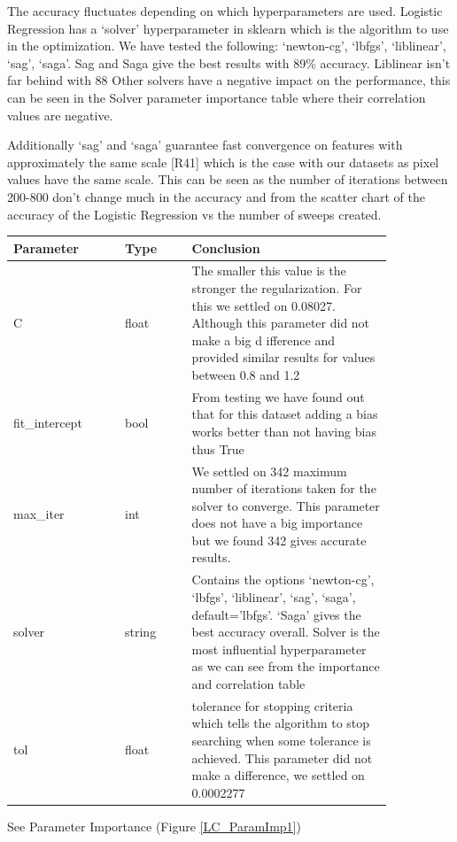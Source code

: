 \documentclass[11pt]{article}
\begin{document}
The accuracy fluctuates depending on which hyperparameters are used. Logistic Regression has a ‘solver’ hyperparameter in sklearn which is the algorithm to use in the optimization. We have tested the following: ‘newton-cg’, ‘lbfgs’, ‘liblinear’, ‘sag’, ‘saga’. Sag and Saga give the best results with 89\% accuracy. Liblinear isn't far behind with 88%
Other solvers have a negative impact on the performance, this can be seen in the Solver parameter importance table where their correlation values are negative.

Additionally ‘sag’ and ‘saga’ guarantee fast convergence on features with approximately the same scale [R41] which is the case with our datasets as pixel values have the same scale. This can be seen as the number of iterations between 200-800 don’t change much in the accuracy and from the scatter chart of the accuracy of the Logistic Regression vs the number of sweeps created.

\begin{table}[ht]
  \centering
  \begin{tabular}{|p{0.25\linewidth} | p{0.15 \linewidth} | p{0.45\linewidth}|} 
    \hline
    \textbf{Parameter} & \textbf{Type} & \textbf{Conclusion} \\ \hline
    C & float & The smaller this value is the stronger the regularization. For this we settled on 0.08027. Although this parameter did not make a big d ifference and provided similar results for values between 0.8 and 1.2 \\ \hline
    fit\_intercept & bool & From testing we have found out that for this dataset adding a bias works better than not having bias thus True  \\ \hline
    max\_iter & int &  We settled on 342 maximum number of iterations taken for the solver to converge. This parameter does not have a big importance but we found 342 gives accurate results. \\ \hline
    solver & string & Contains the options ‘newton-cg’, ‘lbfgs’, ‘liblinear’, ‘sag’, ‘saga’, default=’lbfgs’. ‘Saga’ gives the best accuracy overall. Solver is the most influential hyperparameter as we can see from the importance and correlation table \\ \hline
    tol & float & tolerance for stopping criteria which tells the algorithm to stop searching when some tolerance is achieved. This parameter did not make a difference, we settled on 0.0002277 \\ \hline


  \end{tabular}
\end{table}\label{RF_Analysis_Table}
See Parameter Importance (Figure \ref{LC_ParamImp1})
\end{document}
